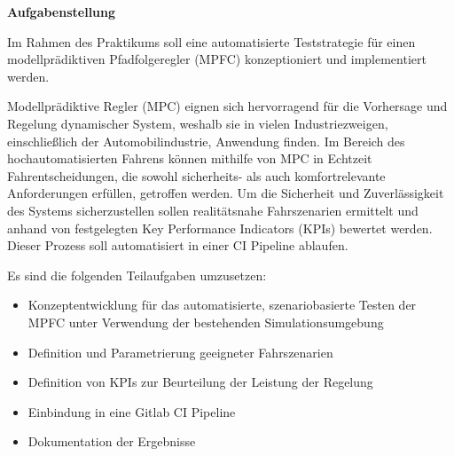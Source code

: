 \noindent\textbf{Aufgabenstellung}\smallskip

\noindent Im Rahmen des Praktikums soll eine automatisierte Teststrategie für einen modellprädiktiven Pfadfolgeregler (MPFC) konzeptioniert und implementiert werden.

Modellprädiktive Regler (MPC) eignen sich hervorragend für die Vorhersage und Regelung dynamischer System, weshalb sie in vielen Industriezweigen, einschließlich der Automobilindustrie, Anwendung finden. Im Bereich des hochautomatisierten Fahrens können mithilfe von MPC in Echtzeit Fahrentscheidungen, die sowohl sicherheits- als auch komfortrelevante Anforderungen erfüllen, getroffen werden. Um die Sicherheit und Zuverlässigkeit des Systems sicherzustellen sollen realitätsnahe Fahrszenarien ermittelt und anhand von festgelegten Key Performance Indicators (KPIs) bewertet werden. Dieser Prozess soll automatisiert in einer CI Pipeline ablaufen.\medskip

\noindent Es sind die folgenden Teilaufgaben umzusetzen:
\begin{itemize}
    \item Konzeptentwicklung für das automatisierte, szenariobasierte Testen der MPFC unter Verwendung der bestehenden Simulationsumgebung
    \item Definition und Parametrierung geeigneter Fahrszenarien
    \item Definition von KPIs zur Beurteilung der Leistung der Regelung
    \item Einbindung in eine Gitlab CI Pipeline
    \item Dokumentation der Ergebnisse
\end{itemize}
